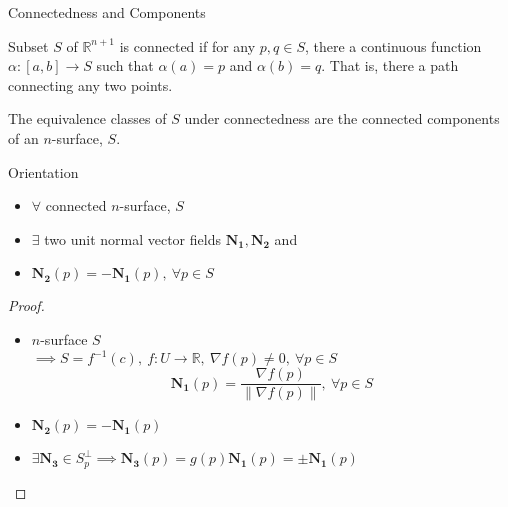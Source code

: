 \documentclass{beamer}
\begin{document}
\begin{frame}{Connectedness and Components}
\begin{definition}[Connectedness]
	Subset $S$ of $\mathbb{R}^{n+1}$ is connected if for any $p,q \in S$, there a continuous function $\alpha : [a,b] \to S$ such that $\alpha(a) = p$ and $\alpha(b) = q$. {\color{purple}That is, there a path connecting any two points.}
\end{definition}

\begin{definition}
	The equivalence classes of $S$ under connectedness are the connected components of an $n$-surface, $S$.
\end{definition}
\end{frame}
\begin{frame}{Orientation}
\begin{theorem}
\begin{itemize}
	\item $\forall$ connected $n$-surface, $S$
	\item $\exists$ two unit normal vector fields $\mathbf{N_1}, \mathbf{N_2}$ and
	\item $\mathbf{N_2}(p) = -\mathbf{N_1}(p),\ \forall p \in S$
\end{itemize}
\end{theorem}
\begin{proof}
\begin{itemize}
	\item $n$-surface $S$\\
		$\implies S = f^{-1}(c),\ f : U \to \mathbb{R},\ \nabla f(p) \ne 0,\ \forall p \in S$
		$$\mathbf{N_1}(p) = \frac{\nabla f(p)}{\|\nabla f(p) \|},\ \forall p \in S$$
	\item $\mathbf{N_2}(p) = -\mathbf{N_1}(p)$
	\item $\exists \mathbf{N_3} \in S_p^{\perp} \implies \mathbf{N_3}(p) = g(p)\mathbf{N_1}(p) = \pm \mathbf{N_1}(p)$
\end{itemize}
\end{proof}
\end{frame}
\end{document}
